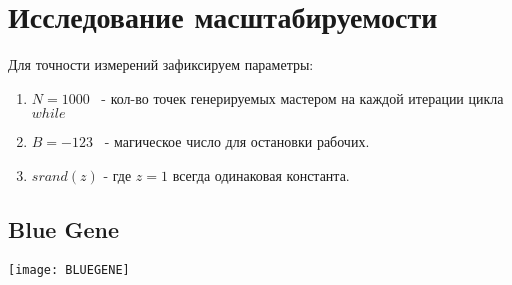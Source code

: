 \documentclass[12pt, a4paper ]{article}
\begin{document}
 \section{\large Исследование масштабируемости}
 Для точности измерений зафиксируем параметры:
\begin{enumerate}
  \item $N = 1000$ ~- кол-во точек генерируемых мастером на каждой итерации цикла $while$
  \item $B = -123$ ~- магическое число для остановки рабочих.
  \item $srand(z)$ - где $z = 1$ всегда одинаковая константа.
\end{enumerate} 
 \newpage
\subsection{\large Blue Gene}
\begin{center}
  \texttt{[image: BLUEGENE]}
\end{center}
\end{document}
